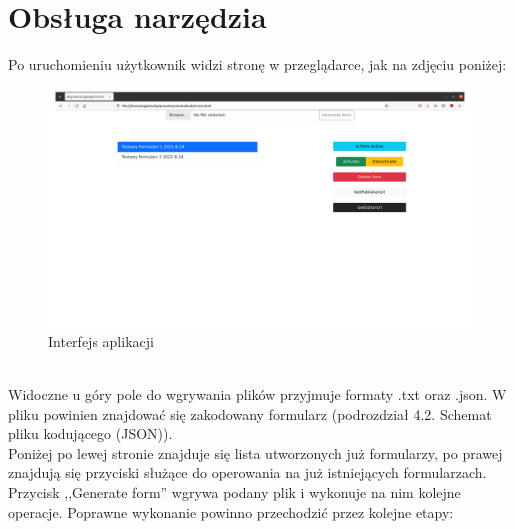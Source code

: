 \section{Obsługa narzędzia}
Po uruchomieniu użytkownik widzi stronę w przeglądarce, jak na zdjęciu poniżej:
\begin{figure}[H]
 \centering
  \includegraphics[scale=0.75]{strona.png}
  \caption{Interfejs aplikacji}
  \label{fig:1}
\end{figure}
\\Widoczne u góry pole do wgrywania plików przyjmuje formaty .txt oraz .json. W pliku powinien znajdować się zakodowany formularz (podrozdział 4.2. Schemat pliku kodującego (JSON)).
\\Poniżej  po lewej stronie znajduje się lista utworzonych już formularzy, po prawej znajdują się przyciski służące do operowania na już istniejących formularzach.
\\Przycisk ,,Generate form'' wgrywa podany plik i  wykonuje na nim kolejne operacje. Poprawne wykonanie powinno przechodzić przez kolejne etapy:
